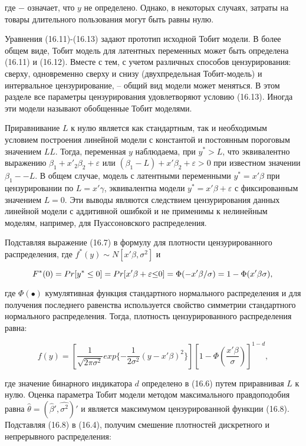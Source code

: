 где $-$ означает, что $y$ не определено. Однако, в некоторых случаях, затраты на товары длительного пользования могут быть равны нулю. 

Уравнения (16.11)-(16.13) задают прототип исходной Тобит модели. В более общем виде, Тобит модель для латентных переменных может быть определена (16.11) и (16.12). Вместе с тем, с учетом различных способов цензурирования: сверху, одновременно сверху и снизу (двухпредельная Тобит-модель) и интервальное цензурирование, -- общий вид модели может меняться. В этом разделе все параметры цензурирования удовлетворяют условию (16.13). Иногда эти модели называют обобщенные Тобит моделями.

Приравнивание $L$ к нулю является как стандартным, так и необходимым условием построения линейной модели с константой и постоянным пороговым значением $LL$. Тогда, переменная $y$ наблюдаема, при $y^{*}>L$, что эквивалентно выражению $\beta_1+x'_2\beta_2+\varepsilon$ или $(\beta_1-L)+x'\beta_2+\varepsilon>0$ при известном значении $\beta_1 -- L$. В общем случае, модель с латентными переменными $y^{*}=x'\beta$ при цензурировании по $L=x'\gamma$, эквивалентна модели $y^{*}=x'\beta+\varepsilon$ с фиксированным значением $L=0$. Эти выводы являются следствием цензурирования данных линейной модели с аддитивной ошибкой и не применимы к нелинейным моделям, например, для Пуассоновского распределения.

Подставляя выражение (16.7) в формулу для плотности цензурированного распределения, где $f^{*}(y){\sim}N[x'\beta, \sigma^2]$ и 

\[
F^{*}(0)=Pr[y^{*}\leq0] \\
=Pr[x'\beta+\varepsilon{\leq}0] \\
=\Phi(-x'\beta/\sigma) \\
=1-\Phi(x'\beta\sigma), \\
\]

где $\Phi(\bullet)$ кумулятивная функция стандартного нормального распределения и для получения последнего равенства используется свойство симметрии стандартного нормального распределения. Тогда, плотность цензурированного распределения равна:

\begin{equation}
f(y)=\left[\dfrac{1}{\sqrt{2\pi\sigma^{2}}}exp\lbrace-\dfrac{1}{2\sigma^{2}}(y-x'\beta)^{2}\rbrace\right]\left[1-\Phi\left(\dfrac{x'\beta}{\sigma}\right)\right]^{1-d},
\end{equation}

где значение бинарного индикатора $d$ определено в (16.6) путем приравнивая $L$ к нулю. Оценка параметра Тобит модели методом максимального правдоподобия равна $\hat{\theta}=(\hat{\beta}',\hat{\sigma^2})'$ и является максимумом цензурированной функции (16.8). Подставляя (16.8) в (16.4), получим смешение плотностей дискретного и непрерывного распределения: 

